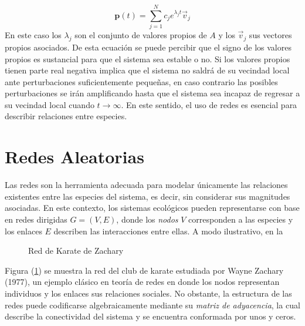 $$\textbf{p}(t)=\sum_{j=1}^N c_{j}e^{\lambda_{j}t}\vec{v}_j$$
En este caso los $\lambda_{j}$ son el conjunto de valores propios de $A$ y los $\vec{v}_j$ sus vectores propios asociados. De esta ecuación se puede percibir que el signo de los valores propios es sustancial para que el sistema sea estable o no. Si los valores propios tienen parte real negativa implica que el sistema no saldrá de su vecindad local ante perturbaciones suficientemente pequeñas, en caso contrario las posibles perturbaciones se irán amplificando hasta que el sistema sea incapaz de regresar a su vecindad local cuando $t\to\infty$. En este sentido, el uso de redes es esencial para describir relaciones entre especies.

\section{Redes Aleatorias}

Las redes son la herramienta adecuada para modelar únicamente las relaciones existentes entre las especies del sistema, es decir, sin considerar sus magnitudes asociadas. En este contexto, los sistemas ecológicos pueden representarse con base en redes dirigidas $G=(V,E)$, donde los \textit{nodos} $V$ corresponden a las especies y los enlaces $E$ describen las interacciones entre ellas. A modo ilustrativo, en la 
\begin{figure} \vspace{-30pt} \begin{center}
		 
	\end{center} 
	\vspace{-20pt} 
	\caption{Red de Karate de Zachary} 
	\vspace{-20pt}
	\label{fig:RedKarate}
\end{figure} 
Figura (\ref{fig:RedKarate}) se muestra la red del club de karate estudiada por Wayne Zachary (1977), un ejemplo clásico en teoría de redes en donde los nodos representan individuos y los enlaces sus relaciones sociales. No obstante, la estructura de las redes puede codificarse algebraicamente mediante su \textit{matriz de adyacencia}, la cual describe la conectividad del sistema y se encuentra conformada por unos y ceros.


